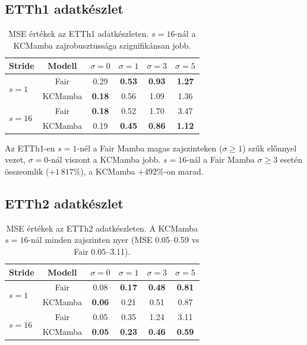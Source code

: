 \subsection{ETTh1 adatkészlet}

\begin{table}[H]
    \centering
    \small
    \begin{tabular}{|l|c|cccc|}
        \hline
        \textbf{Stride} & \textbf{Modell} &
        $\sigma=0$ & $\sigma=1$ & $\sigma=3$ & $\sigma=5$ \\
        \hline\hline
        \multirow{2}{*}{$s=1$}
            & Fair      & 0.29 & \textbf{0.53} & \textbf{0.93} & \textbf{1.27} \\
            & KCMamba   & \textbf{0.18} & 0.56 & 1.09 & 1.36 \\
        \hline
        \multirow{2}{*}{$s=16$}
            & Fair      & \textbf{0.18} & 0.52 & 1.70 & 3.47 \\
            & KCMamba   & 0.19 & \textbf{0.45} & \textbf{0.86} & \textbf{1.12} \\
        \hline
    \end{tabular}
    \caption{MSE értékek az ETTh1 adatkészleten. $s=16$-nál a KCMamba zajrobusztussága szignifikánsan jobb.}
    \label{tab:etth1}
\end{table}

Az ETTh1-en $s=1$-nél a Fair Mamba magas zajszinteken ($\sigma \ge 1$) szűk
előnnyel vezet, $\sigma=0$-nál viszont a KCMamba jobb. $s=16$-nál
a Fair Mamba $\sigma \ge 3$ esetén összeomlik ($+1\,817\%$), a KCMamba $+492\%$-on marad.

\subsection{ETTh2 adatkészlet}

\begin{table}[H]
    \centering
    \small
    \begin{tabular}{|l|c|cccc|}
        \hline
        \textbf{Stride} & \textbf{Modell} &
        $\sigma=0$ & $\sigma=1$ & $\sigma=3$ & $\sigma=5$ \\
        \hline\hline
        \multirow{2}{*}{$s=1$}
            & Fair      & 0.08 & \textbf{0.17} & \textbf{0.48} & \textbf{0.81} \\
            & KCMamba   & \textbf{0.06} & 0.21 & 0.51 & 0.87 \\
        \hline
        \multirow{2}{*}{$s=16$}
            & Fair      & 0.05 & 0.35 & 1.24 & 3.11 \\
            & KCMamba   & \textbf{0.05} & \textbf{0.23} & \textbf{0.46} & \textbf{0.59} \\
        \hline
    \end{tabular}
    \caption{MSE értékek az ETTh2 adatkészleten. A KCMamba $s=16$-nál minden zajszinten nyer (MSE 0.05--0.59 vs Fair 0.05--3.11).}
    \label{tab:etth2}
\end{table}

